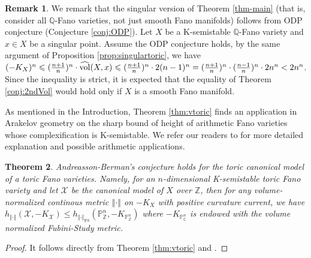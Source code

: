 \documentclass[12pt]{amsart}
\newcommand{\hvol}{{\widehat{\rm vol}}}
\newtheorem{thm}{Theorem}[section]
\theoremstyle{definition}
\newtheorem{rmk}[thm]{Remark}
\newcommand{\IC}{{\mathbb C}}
\newcommand{\IP}{{\mathbb P}}
\newcommand{\IQ}{{\mathbb Q}}
\newcommand{\IZ}{{\mathbb Z}}
\newcommand{\CX}{{\mathcal X}}
\newcommand{\lee}{\leqslant}
\begin{document}
\begin{rmk}\label{rem-sing}
    We remark that the singular version of Theorem \ref{thm-main} (that is, consider all $\IQ$-Fano varieties, not just smooth Fano manifolds) follows from ODP conjecture (Conjecture \ref{conj:ODP}). Let $X$ be a K-semistable $\IQ$-Fano variety and $x\in X$ be a singular point. Assume the ODP conjecture holds, by the same argument of Proposition \ref{prop:singulartoric}, we have $(-K_X)^n \lee (\frac{n+1}{n})^n\cdot \hvol(X,x)\lee (\frac{n+1}{n})^n\cdot 2(n-1)^n=(\frac{n+1}{n})^n\cdot (\frac{n-1}{n})^n\cdot 2n^n<2n^n$. Since the inequality is strict, it is expected that the equality of Theorem \ref{conj:2ndVol}  would hold only if $X$ is a smooth Fano manifold.
\end{rmk}
As mentioned in the Introduction, Theorem \ref{thm:vtoric} finds an application in Arakelov geometry on the sharp bound of height of arithmetic Fano varieties whose complexification is K-semistable. We refer our readers to \cite{AB24, Ber25} for more detailed explanation and possible arithmetic applications.
\begin{thm}
    Andreasson-Berman's conjecture holds for the toric canonical model of a toric Fano varieties. Namely, for an $n$-dimensional K-semistable toric Fano variety and let $\CX$ be the canonical model of $X$ over $\IZ$, then for any volume-normalized continous metric $\left\Vert \cdot\right\Vert$ on $-K_X$ with positive curvature current, we have $h_{\left\Vert \cdot\right\Vert}(\CX,-K_{\CX})\leq h_{\left\Vert \cdot\right\Vert_{\text{FS}}}(\IP^n_{\IZ},-K_{\IP^n_{\IZ}})$ where $-K_{\IP^n_{\IC}}$ is endowed with the volume normalized Fubini-Study metric. 
\end{thm}
\begin{proof}
    It follows directly from Theorem \ref{thm:vtoric} and \cite[Lemma 3.8]{AB24}.
\end{proof}
\end{document}
